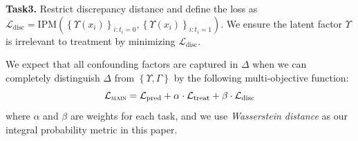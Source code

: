 \documentclass[sigconf]{acmart}
\begin{document}
\textbf{Task3.} Restrict discrepancy distance and define the loss as $\mathcal{L}_{\text{disc}}=\textrm{IPM} \left (\left \{ \Upsilon(x_{i}) \right \}_{i:t_{i}=0}, \left \{ \Upsilon(x_{i}) \right \}_{i:t_{i}=1}  \right )$. We ensure the latent factor $\Upsilon$ is irrelevant to treatment by minimizing $\mathcal{L}_{\text{disc}}$. \par
We expect that all confounding factors are captured in $\Delta$ when we can completely distinguish $\Delta$ from $\left \{ \Upsilon,\Gamma\right \}$ by the following multi-objective function:
\begin{equation}
\label{E1}
    \mathcal{L}_{\textsc{main}}=\mathcal{L}_{\text{pred}} + \alpha \cdot \mathcal{L}_{\text{treat}} +\beta \cdot \mathcal{L}_{\text{disc}}
\end{equation}
where $\alpha$ and $\beta$ are weights for each task, and we use \textit{Wasserstein distance} as our integral probability metric in this paper.\par
\end{document}
